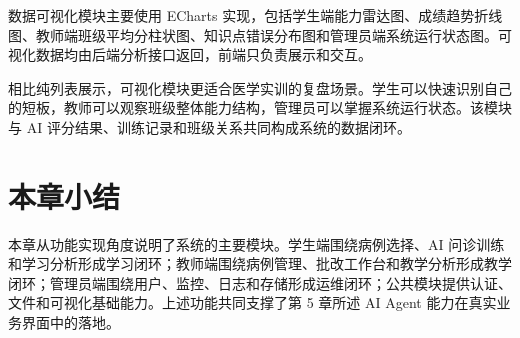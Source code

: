 数据可视化模块主要使用 ECharts 实现，包括学生端能力雷达图、成绩趋势折线图、教师端班级平均分柱状图、知识点错误分布图和管理员端系统运行状态图。可视化数据均由后端分析接口返回，前端只负责展示和交互。

相比纯列表展示，可视化模块更适合医学实训的复盘场景。学生可以快速识别自己的短板，教师可以观察班级整体能力结构，管理员可以掌握系统运行状态。该模块与 AI 评分结果、训练记录和班级关系共同构成系统的数据闭环。

\section{本章小结}

本章从功能实现角度说明了系统的主要模块。学生端围绕病例选择、AI 问诊训练和学习分析形成学习闭环；教师端围绕病例管理、批改工作台和教学分析形成教学闭环；管理员端围绕用户、监控、日志和存储形成运维闭环；公共模块提供认证、文件和可视化基础能力。上述功能共同支撑了第 5 章所述 AI Agent 能力在真实业务界面中的落地。
